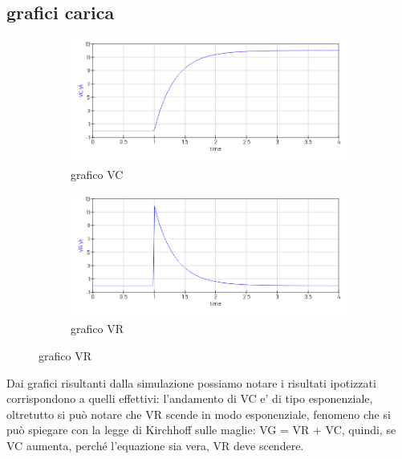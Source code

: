\documentclass[12pt]{article}
\begin{document}
\subsection*{grafici carica}
\begin{figure}[h!]
  \centering
  \begin{subfigure}[b]{0.49\linewidth}
    \includegraphics[width=\linewidth]{data/carica-VC.png}
    \caption*{grafico VC}
  \end{subfigure}
  \begin{subfigure}[b]{0.49\linewidth}
    \includegraphics[width=\linewidth]{data/carica-VR.png}
    \caption*{grafico VR}
  \end{subfigure}
  
\end{figure}
Dai grafici risultanti dalla simulazione possiamo notare i risultati ipotizzati corrispondono a quelli effettivi: l'andamento di VC e' di tipo esponenziale, oltretutto si può notare che VR scende in modo esponenziale, fenomeno che si può spiegare con la legge di Kirchhoff sulle maglie: VG = VR + VC, quindi, se VC aumenta, perché l'equazione sia vera, VR deve scendere. \\
\end{document}
